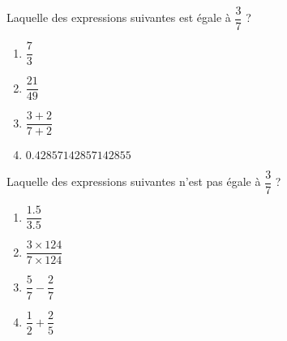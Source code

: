 
\begin{exercice}\label{exo2smath-0088}

    Laquelle des expressions suivantes est égale à \( \dfrac{ 3 }{ 7 }\) ?
    \begin{multicols}{4}
        \begin{enumerate}
            \item
                \( \dfrac{ 7 }{ 3 }\)
            \item
                \( \dfrac{ 21 }{ 49 }\)
            \item
                \( \dfrac{ 3+2 }{ 7+2 }\)
            \item
    $0.42857142857142855$
        \end{enumerate}
    \end{multicols}

    Laquelle des expressions suivantes n'est pas égale à \( \dfrac{ 3 }{ 7 }\) ?
    \begin{multicols}{4}
        \begin{enumerate}
            \item
                \( \dfrac{ 1.5 }{ 3.5 }\)
            \item
                \( \dfrac{ 3\times 124 }{ 7\times 124 }\)
            \item
                \( \dfrac{ 5 }{ 7 }-\dfrac{ 2 }{ 7 }\)
            \item
                \( \dfrac{ 1 }{ 2 }+\dfrac{ 2 }{ 5 }\)
        \end{enumerate}
    \end{multicols}

\end{exercice}
